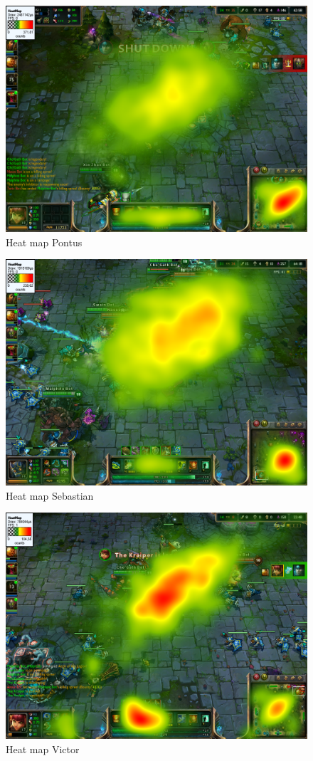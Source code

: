 \documentclass{article}
\begin{document}
\begin{figure}[h!]
\begin{center}
\includegraphics*[width=0.90\columnwidth]{images/heatmap/Pontus}
\end{center}
\caption{Heat map Pontus}
\label{heat_pon}
\end{figure}

\begin{figure}[h!]
\begin{center}
\includegraphics*[width=0.90\columnwidth]{images/heatmap/Sebastian}
\end{center}
\caption{Heat map Sebastian}
\label{heat_seb}
\end{figure}

\begin{figure}[h!]
\begin{center}
\includegraphics*[width=0.90\columnwidth]{images/heatmap/Victor}
\end{center}
\caption{Heat map Victor}
\label{heat_vic}
\end{figure}
\end{document}
